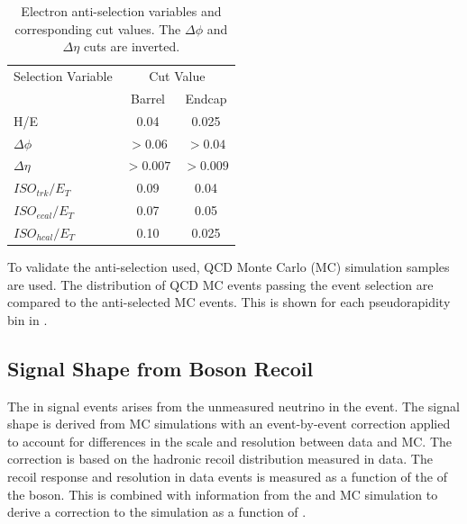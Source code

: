 \begin{table}[htbp]
  \begin{center}
    \leavevmode
    \begin{tabular}{lcc} 
    \toprule
      Selection Variable & \multicolumn{2}{c}{Cut Value}\\
                         & Barrel & Endcap\\
    \midrule
        H/E & 0.04 & 0.025 \\
        $\Delta\phi$ & $>0.06$  & $>0.04$ \\
        $\Delta\eta$ & $>0.007$ & $>0.009$\\
        $ISO_{trk} / E_T $ & 0.09 & 0.04 \\
        $ISO_{ecal}/ E_T$  & 0.07 & 0.05 \\
        $ISO_{hcal}/ E_T$  & 0.10 & 0.025\\ 
    \bottomrule
    \end{tabular}
    \caption{\label{tab:antisel}Electron anti-selection variables and
corresponding cut values. The $\Delta\phi$ and $\Delta\eta$ cuts are inverted\cite{baisini2010electron}.}
  \end{center}
\end{table}

To validate the anti-selection used, {QCD} Monte Carlo (MC) simulation samples are used. The
distribution of {QCD} MC events passing the event selection are compared to the
anti-selected MC events. This is shown for each pseudorapidity bin in
.

\subsection{Signal \ETm Shape from Boson Recoil}
\label{sec:recoil}
The \ETm in signal events arises from the unmeasured neutrino in the event. 
The signal \ETm shape is derived from MC simulations with an event-by-event
correction applied to account for differences in the \ETm scale and resolution
between data and MC.
The correction is based on the hadronic recoil distribution measured in data.
The recoil response and resolution in \HepProcess{\PZ\to\Plepton\Plepton} data
events is measured as a function of the \pT of the boson. This is combined with
information from the \PW and \PZ MC simulation to derive a correction to
the simulation \ETm as a function of \PW \pT
\cite{bauer2010modeling,alcaraz2010updated}.


